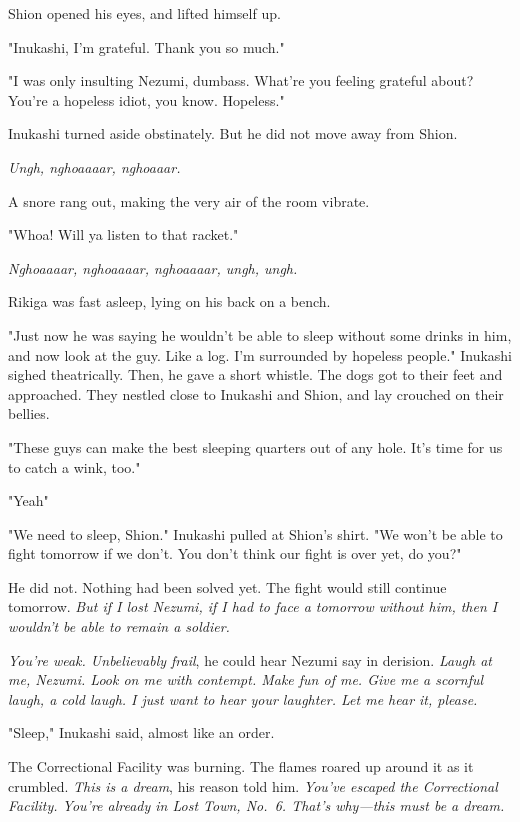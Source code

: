 Shion opened his eyes, and lifted himself up.

"Inukashi, I'm grateful. Thank you so much."

"I was only insulting Nezumi, dumbass. What're you feeling grateful
about? You're a hopeless idiot, you know. Hopeless."

Inukashi turned aside obstinately. But he did not move away from Shion.

\emph{Ungh, nghoaaaar, nghoaaar.}

A snore rang out, making the very air of the room vibrate.

"Whoa! Will ya listen to that racket."

\emph{Nghoaaaar, nghoaaaar, nghoaaaar, ungh, ungh.}

Rikiga was fast asleep, lying on his back on a bench.

"Just now he was saying he wouldn't be able to sleep without some drinks
in him, and now look at the guy. Like a log. I'm surrounded by hopeless
people." Inukashi sighed theatrically. Then, he gave a short whistle.
The dogs got to their feet and approached. They nestled close to
Inukashi and Shion, and lay crouched on their bellies.

"These guys can make the best sleeping quarters out of any hole. It's
time for us to catch a wink, too."

"Yeah\el "

"We need to sleep, Shion." Inukashi pulled at Shion's shirt. "We won't
be able to fight tomorrow if we don't. You don't think our fight is over
yet, do you?"

He did not. Nothing had been solved yet. The fight would still continue
tomorrow. \emph{But if I lost Nezumi, if I had to face a tomorrow without him,
then I wouldn't be able to remain a soldier.}

\emph{You're weak. Unbelievably frail}, he could hear Nezumi say in derision.
\emph{Laugh at me, Nezumi. Look on me with contempt. Make fun of me. Give me a
scornful laugh, a cold laugh. I just want to hear your laughter. Let me
hear it, please.}

"Sleep," Inukashi said, almost like an order.

\mybreak

The Correctional Facility was burning. The flames roared up around it as
it crumbled. \emph{This is a dream}, his reason told him. \emph{You've escaped the
Correctional Facility. You're already in Lost Town, No.~6. That's
why---this must be a dream.}

